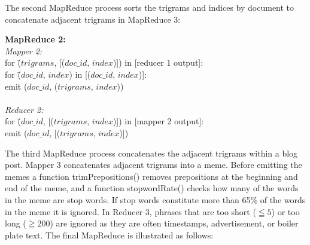 \documentclass{sig-alternate}
\begin{document}
The second MapReduce process sorts the trigrams and indices by document to concatenate adjacent trigrams in MapReduce 3:

\begin{centering}
\begin{tabbing}
\textbf{MapReduce 2:}\\
\emph{Mapper 2:}\\
for \= ($trigrams$, [($doc\_id$, $index$)]) in [reducer 1 output]:\\
\>	for \= ($doc\_id$, $index$) in [($doc\_id$, $index$)]:\\
\>\> emit ($doc\_id$, ($trigrams$, $index$))\\
\\
\emph{Reducer 2:}\\
for \= ($doc\_id$, [($trigrams$, $index$)]) in [mapper 2 output]:\\
\>	emit ($doc\_id$, [($trigrams$, $index$)])

\end{tabbing}

\end{centering}

The third MapReduce process concatenates the adjacent trigrams within a blog post. Mapper 3 concatenates adjacent trigrams into a meme. Before emitting the memes a function trimPrepositions() removes prepositions at the beginning and end of the meme, and a function stopwordRate() checks how many of the words in the meme are stop words. If stop words constitute more than 65\% of the words in the meme it is ignored. In Reducer 3, phrases that are too short ($\leqq 5$) or too long ($\geqq 200$) are ignored as they are often timestamps, advertisement, or boiler plate text. The final MapReduce is illustrated as follows:
\end{document}
